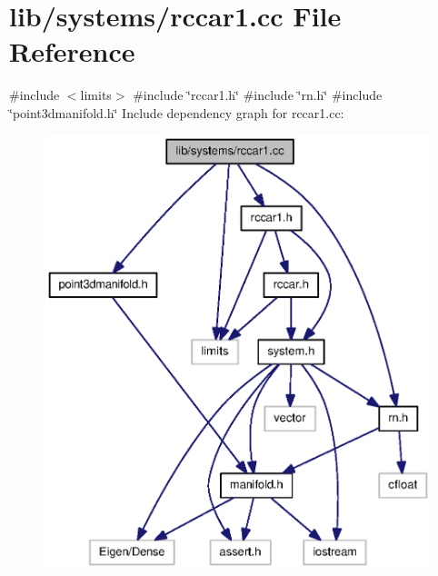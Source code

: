 \section{lib/systems/rccar1.cc \-File \-Reference}
\label{rccar1_8cc}
{\ttfamily \#include $<$limits$>$}\*
{\ttfamily \#include \char`\"{}rccar1.\-h\char`\"{}}\*
{\ttfamily \#include \char`\"{}rn.\-h\char`\"{}}\*
{\ttfamily \#include \char`\"{}point3dmanifold.\-h\char`\"{}}\*
\-Include dependency graph for rccar1.\-cc\-:\nopagebreak
\begin{figure}[H]
\begin{center}
\leavevmode
\includegraphics[width=350pt]{rccar1_8cc__incl}
\end{center}
\end{figure}
